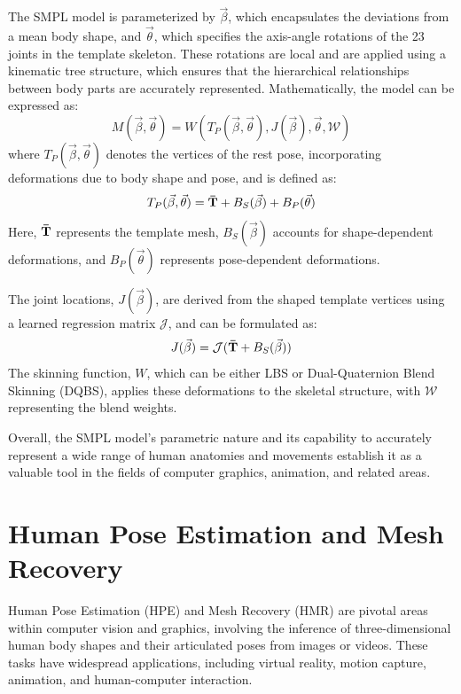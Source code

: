The SMPL model is parameterized by $\vec{\beta}$, which encapsulates the deviations from a mean body shape, and $\vec{\theta}$, which specifies the axis-angle rotations of the 23 joints in the template skeleton. These rotations are local and are applied using a kinematic tree structure, which ensures that the hierarchical relationships between body parts are accurately represented. Mathematically, the model can be expressed as:
\begin{equation}
    M(\vec{\beta}, \vec{\theta}) = W(T_P(\vec{\beta}, \vec{\theta}), J(\vec{\beta}), \vec{\theta}, \mathcal{W})
\end{equation}
where $T_P(\vec{\beta}, \vec{\theta})$ denotes the vertices of the rest pose, incorporating deformations due to body shape and pose, and is defined as:
\begin{equation}
    T_P(\vec{\beta}, \vec{\theta}) = \boldsymbol{\mathbf{\bar{T}}} + B_S(\vec{\beta}) + B_P(\vec{\theta})
\end{equation}
Here, $\boldsymbol{\mathbf{\bar{T}}}$ represents the template mesh, $B_S(\vec{\beta})$ accounts for shape-dependent deformations, and $B_P(\vec{\theta})$ represents pose-dependent deformations.

The joint locations, $J(\vec{\beta})$, are derived from the shaped template vertices using a learned regression matrix $\mathcal{J}$, and can be formulated as:
\begin{equation}
    J(\vec{\beta}) = \mathcal{J}(\boldsymbol{\mathbf{\bar{T}}} + B_S(\vec{\beta}))
\end{equation}
The skinning function, $W$, which can be either LBS or Dual-Quaternion Blend Skinning (DQBS), applies these deformations to the skeletal structure, with $\mathcal{W}$ representing the blend weights.

Overall, the SMPL model's parametric nature and its capability to accurately represent a wide range of human anatomies and movements establish it as a valuable tool in the fields of computer graphics, animation, and related areas.

\section{Human Pose Estimation and Mesh Recovery}
Human Pose Estimation (HPE) and Mesh Recovery (HMR) are pivotal areas within computer vision and graphics, involving the inference of three-dimensional human body shapes and their articulated poses from images or videos. These tasks have widespread applications, including virtual reality, motion capture, animation, and human-computer interaction.

